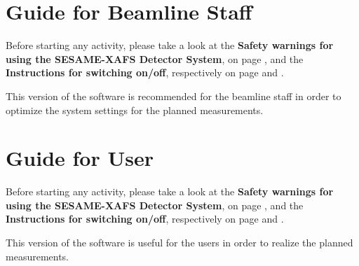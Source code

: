 \documentclass[a4paper,12pt,oneside,pdflatex,italian,final,twocolumn]{article}
\begin{document}
\clearpage

\section{Guide for Beamline Staff}

Before starting any activity, please take a look at the \textbf{Safety warnings for using the SESAME-XAFS Detector System}, on page \pageref{accensione}, and the \textbf{Instructions for switching on/off}, respectively on page \pageref{accensione} and \pageref{spegnimento}.

This version of the software is recommended for the beamline staff in order to optimize the system settings for the planned measurements.








\section{Guide for User}

Before starting any activity, please take a look at the \textbf{Safety warnings for using the SESAME-XAFS Detector System}, on page \pageref{accensione}, and the \textbf{Instructions for switching on/off}, respectively on page \pageref{accensione} and \pageref{spegnimento}.

This version of the software is useful for the users in order to realize the planned measurements.






\end{document}
